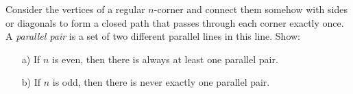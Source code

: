 Consider the vertices of a regular $n$-corner and connect them somehow with sides or
diagonals to form a closed path that passes through each corner exactly once.
A \emph{parallel pair} is a set of two different parallel lines in this line. Show:
\begin{enumerate}
    \item[a)] If $n$ is even, then there is always at least one parallel pair.
    \item[b)] If $n$ is odd, then there is never exactly one parallel pair.
\end{enumerate}
